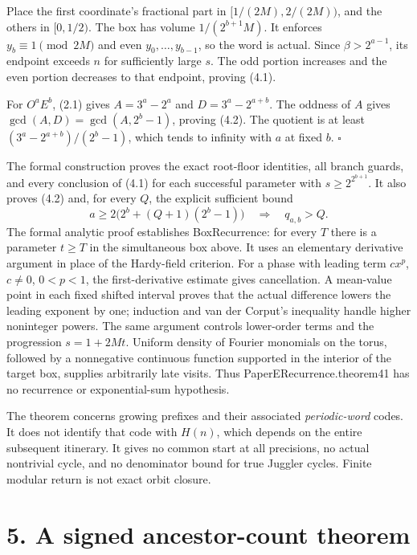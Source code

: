 \documentclass[11pt,a4paper]{article}
\begin{document}
Place the first coordinate's fractional part in \([1/(2M),2/(2M))\), and
the others in \([0,1/2)\). The box has volume \(1/(2^{b+1}M)\). It
enforces \(y_b\equiv1\pmod{2M}\) and even \(y_0,\ldots,y_{b-1}\), so the
word is actual. Since \(\beta>2^{a-1}\), its endpoint exceeds \(n\) for
sufficiently large \(s\). The odd portion increases and the even portion
decreases to that endpoint, proving (4.1).

For \(O^aE^b\), (2.1) gives \(A=3^a-2^a\) and \(D=3^a-2^{a+b}\). The
oddness of \(A\) gives \(\gcd(A,D)=\gcd(A,2^b-1)\), proving (4.2). The
quotient is at least \((3^a-2^{a+b})/(2^b-1)\), which tends to infinity
with \(a\) at fixed \(b\). \(\square\)

The formal construction proves the exact root-floor identities, all
branch guards, and every conclusion of (4.1) for each successful
parameter with \(s\ge2^{2^{b+1}}\). It also proves (4.2) and, for every
\(Q\), the explicit sufficient bound \[
a\ge2\bigl(2^b+(Q+1)(2^b-1)\bigr)\quad\Longrightarrow\quad q_{a,b}>Q.
\] The formal analytic proof establishes BoxRecurrence: for every \(T\)
there is a parameter \(t\ge T\) in the simultaneous box above. It uses
an elementary derivative argument in place of the Hardy-field criterion.
For a phase with leading term \(cx^p\), \(c\ne0\), \(0<p<1\), the
first-derivative estimate gives cancellation. A mean-value point in each
fixed shifted interval proves that the actual difference lowers the
leading exponent by one; induction and van der Corput's inequality
handle higher noninteger powers. The same argument controls lower-order
terms and the progression \(s=1+2Mt\). Uniform density of Fourier
monomials on the torus, followed by a nonnegative continuous function
supported in the interior of the target box, supplies arbitrarily late
visits. Thus PaperERecurrence.theorem41 has no recurrence or
exponential-sum hypothesis.

The theorem concerns growing prefixes and their associated
\emph{periodic-word} codes. It does not identify that code with
\(H(n)\), which depends on the entire subsequent itinerary. It gives no
common start at all precisions, no actual nontrivial cycle, and no
denominator bound for true Juggler cycles. Finite modular return is not
exact orbit closure.

\section{5. A signed ancestor-count
theorem}\label{a-signed-ancestor-count-theorem}
\end{document}
